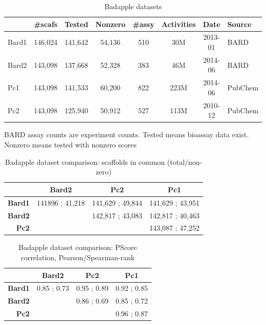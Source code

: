 \begin{table}
\caption{Badapple datasets}
\begin{center}
\begin{tabular}{ |l|c|c|c|c|c|c|l| } 
\hline
& \textbf{\#scafs} & \textbf{Tested} & \textbf{Nonzero} & \textbf{\#assy} & \textbf{Activities} & \textbf{Date} & \textbf{Source} \\
\hline
Bard1 & 146,024 & 141,642 & 54,136 & 510 & 30M & 2013-01 & BARD \\
Bard2 & 143,098 & 137,668 & 52,328 & 383 & 46M & 2014-06 & BARD \\
Pc1 & 143,098 & 141,533 & 60,200 & 822 & 223M & 2014-06 & PubChem \\
Pc2 & 143,098 & 125,940 & 50,912 & 527 & 113M & 2010-12 & PubChem \\
\hline
\end{tabular}
\end{center}
\label{table:ba_dsets}
\end{table}


BARD assay counts are experiment counts. Tested means bioassay data exist. Nonzero means tested with nonzero scores


\begin{table}
\caption{Badapple dataset comparison: scaffolds in common (total/non-zero)}
\begin{center}
\begin{tabular}{ |r|c|c|c| } 
\hline
& \textbf{Bard2} & \textbf{Pc2} & \textbf{Pc1} \\
\hline
\textbf{Bard1} & 141896 ; 41,218 & 141,629 ; 49,844 & 141,629 ; 43,951 \\
\hline
\textbf{Bard2} & & 142,817 ; 43,083 & 142,817 ; 40,463 \\
\hline
\textbf{Pc2} & & & 143,087 ; 47,252 \\
\hline
\end{tabular}
\end{center}
\label{table:ba_cmp_scaf}
\end{table}



\begin{table}
\caption{Badapple dataset comparison: PScore correlation, Pearson/Spearman-rank}
\begin{center}
\begin{tabular}{ |r|c|c|c| } 
\hline
& \textbf{Bard2} & \textbf{Pc2} & \textbf{Pc1} \\
\hline
\textbf{Bard1} & 0.85 ; 0.73 & 0.95 ; 0.89 & 0.92 ; 0.85 \\
\hline
\textbf{Bard2} & & 0.86 ; 0.69 & 0.85 ; 0.72 \\
\hline
\textbf{Pc2} & & & 0.96 ; 0.87 \\
\hline
\end{tabular}
\end{center}
\label{table:ba_cmp_corr}
\end{table}


